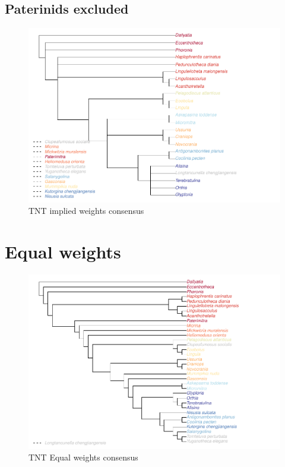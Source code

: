 \documentclass[]{book}
\theoremstyle{definition}
\theoremstyle{definition}
\theoremstyle{definition}
\theoremstyle{remark}
\begin{document}
\hypertarget{paterinids-excluded}{%
\subsection{Paterinids excluded}\label{paterinids-excluded}}

\begin{figure}
\centering
\includegraphics{Brachiopod_phylogeny_files/figure-latex/unnamed-chunk-11-1.pdf}
\caption{\label{fig:unnamed-chunk-11}TNT implied weights consensus}
\end{figure}

\hypertarget{equal-weights}{%
\section{Equal weights}\label{equal-weights}}

\begin{figure}
\centering
\includegraphics{Brachiopod_phylogeny_files/figure-latex/unnamed-chunk-12-1.pdf}
\caption{\label{fig:unnamed-chunk-12}TNT Equal weights consensus}
\end{figure}
\end{document}
